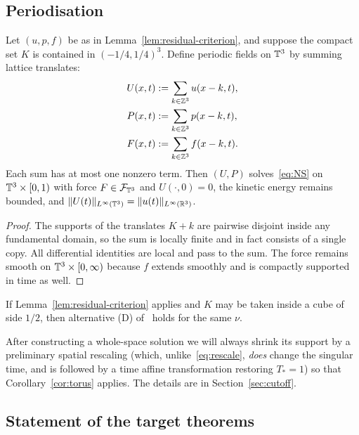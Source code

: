 \subsection{Periodisation}

\begin{lemma}[Periodisation]
\label{lem:periodise}
Let $(u,p,f)$ be as in Lemma~\ref{lem:residual-criterion}, and suppose the compact set $K$ is contained in $(-1/4,1/4)^3$. Define periodic fields on $\mathbb{T}^3$ by summing lattice translates:
\begin{align*}
U(x,t)&:=\sum_{k\in\mathbb{Z}^3}u(x-k,t),\\
P(x,t)&:=\sum_{k\in\mathbb{Z}^3}p(x-k,t),\\
F(x,t)&:=\sum_{k\in\mathbb{Z}^3}f(x-k,t).
\end{align*}
Each sum has at most one nonzero term. Then $(U,P)$ solves~\eqref{eq:NS} on $\mathbb{T}^3\times[0,1)$ with force $F\in\mathcal F_{\mathbb{T}^3}$ and $U(\cdot,0)=0$, the kinetic energy remains bounded, and $\|U(t)\|_{L^\infty(\mathbb{T}^3)}=\|u(t)\|_{L^\infty(\mathbb{R}^3)}$.
\end{lemma}

\begin{proof}
The supports of the translates $K+k$ are pairwise disjoint inside any fundamental domain, so the sum is locally finite and in fact consists of a single copy. All differential identities are local and pass to the sum. The force remains smooth on $\mathbb{T}^3\times[0,\infty)$ because $f$ extends smoothly and is compactly supported in time as well.
\end{proof}

\begin{corollary}[Alternative (D)]
\label{cor:torus}
If Lemma~\ref{lem:residual-criterion} applies and $K$ may be taken inside a cube of side $1/2$, then alternative \textup{(D)} of~\cite{fefferman2000} holds for the same $\nu$.
\end{corollary}

After constructing a whole-space solution we will always shrink its support by a preliminary spatial rescaling (which, unlike~\eqref{eq:rescale}, \emph{does} change the singular time, and is followed by a time affine transformation restoring $T_*=1$) so that Corollary~\ref{cor:torus} applies. The details are in Section~\ref{sec:cutoff}.

\subsection{Statement of the target theorems}

